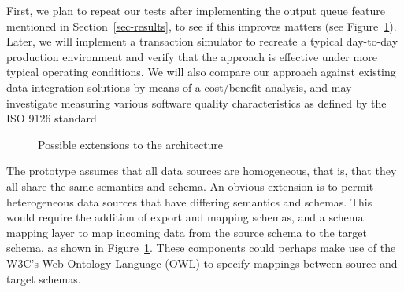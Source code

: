 \documentclass{CRPITStyle}
\begin{document}
First, we plan to repeat our tests after implementing the output queue
feature mentioned in Section~\ref{sec-results}, to see if this improves
matters (see Figure~\ref{fig-extended}). Later, we will implement a
transaction simulator to recreate a typical day-to-day production
environment and verify that the approach is effective under more typical
operating conditions. We will also compare our approach against existing
data integration solutions by means of a cost/benefit analysis, and may
investigate measuring various software quality characteristics as
defined by the ISO 9126 standard \cite{ISO-2001-9126-1}.


\begin{figure}[htb]
	\caption{Possible extensions to the architecture}
	\label{fig-extended}
\end{figure}


The prototype assumes that all data sources are homogeneous, that is,
that they all share the same semantics and schema. An obvious extension
is to permit heterogeneous data sources that have differing semantics
and schemas. This would require the addition of export and mapping
schemas, and a schema mapping layer to map incoming data from the source
schema to the target schema, as shown in Figure~\ref{fig-extended}.
These components could perhaps make use of the W3C's Web Ontology
Language (OWL) \cite{McGu-DL-2004-OWL} to specify mappings between
source and target schemas.
\end{document}
